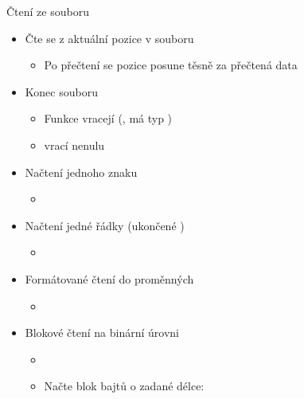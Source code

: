 \begin{frame}{Čtení ze souboru}

  \begin{itemize}
    \item Čte se z aktuální pozice v souboru
    \begin{itemize}
      \item Po přečtení se pozice posune těsně za přečtená data
    \end{itemize}

    \pause

    \item Konec souboru
    \begin{itemize}
      \item Funkce vracejí  (\pozor, má typ )
      \item {} vrací nenulu
    \end{itemize}

    \pause

    \item Načtení jednoho znaku
    \begin{itemize}
      \item {}
    \end{itemize}

    \pause

    \item Načtení jedné řádky (ukončené \code{\\n})
    \begin{itemize}
      \item {}
    \end{itemize}

    \pause

    \item Formátované čtení do proměnných
    \begin{itemize}
      \item {}
    \end{itemize}

    \pause

    \item Blokové čtení na binární úrovni
    \begin{itemize}
      \item {}
      \item Načte blok bajtů o zadané délce: 
    \end{itemize}
  \end{itemize}

\end{frame}

